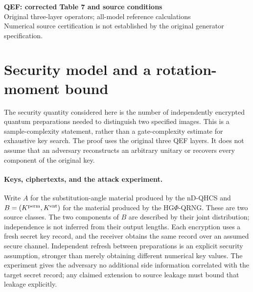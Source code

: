 \documentclass[11pt,a4paper]{article}
\let\subsubsection\section
\begin{document}
\begin{center}
{\LARGE\bfseries QEF: corrected Table 7 and source conditions}\\[5pt]
{\large Original three-layer operators; all-model reference calculations}\\[4pt]
{\small Numerical source certification is not established by the original generator specification.}
\end{center}
\setcounter{table}{6}
\subsubsection{Security model and a rotation-moment bound}
\label{sec:qef_moment_security}
{\color{red}
The security quantity considered here is the number of independently
encrypted quantum preparations needed to distinguish two specified images.
This is a sample-complexity statement, rather than a gate-complexity estimate
for exhaustive key search. The proof uses the original three QEF layers.
It does not assume that an adversary reconstructs an arbitrary unitary or
recovers every component of the original key.

\paragraph{Keys, ciphertexts, and the attack experiment.}
Write $A$ for the substitution-angle material produced by the nD-QHCS and
$B=(K^{\rm perm},K^{\rm ent})$ for the material produced by the
HG$\Phi$-QRNG. These are two source classes. The two components of $B$
are described by their joint distribution; independence is not inferred
from their output lengths. Each encryption uses a fresh secret key record,
and the receiver obtains the same record over an assumed secure channel.
Independent refresh between preparations is an explicit security
assumption, stronger than merely obtaining different numerical key values.
The experiment gives the adversary no additional side information
correlated with the target secret record; any claimed extension to
source leakage must bound that leakage explicitly.

}
\end{document}
